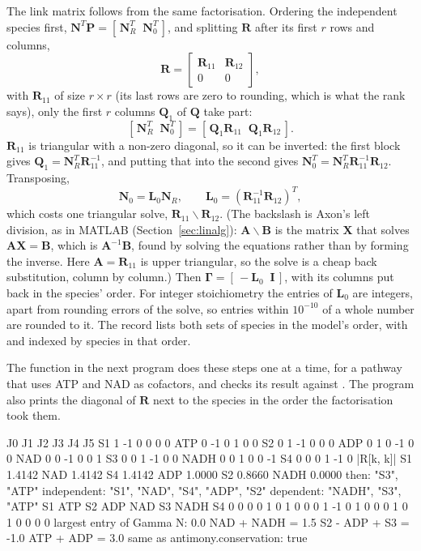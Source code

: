 \documentclass[11pt,a4paper,openany]{report}
\begin{document}
{{The link matrix follows from the same factorisation. Ordering the
independent species first, $\mathbf{N}^T \mathbf{P} = [\,\mathbf{N}_R^T
\;\; \mathbf{N}_0^T\,]$, and splitting $\mathbf{R}$ after its first $r$ rows
and columns,
\[
  \mathbf{R} = \begin{bmatrix} \mathbf{R}_{11} & \mathbf{R}_{12} \\ 0 & 0 \end{bmatrix} ,
\]
with $\mathbf{R}_{11}$ of size $r \times r$ (its last rows are zero to
rounding, which is what the rank says), only the first $r$ columns
$\mathbf{Q}_1$ of $\mathbf{Q}$ take part:
\[
  [\,\mathbf{N}_R^T \;\; \mathbf{N}_0^T\,]
    = [\,\mathbf{Q}_1 \mathbf{R}_{11} \;\; \mathbf{Q}_1 \mathbf{R}_{12}\,] .
\]
$\mathbf{R}_{11}$ is triangular with a non-zero diagonal, so it can be
inverted: the first block gives $\mathbf{Q}_1 = \mathbf{N}_R^T
\mathbf{R}_{11}^{-1}$, and putting that into the second gives
$\mathbf{N}_0^T = \mathbf{N}_R^T \mathbf{R}_{11}^{-1} \mathbf{R}_{12}$.
Transposing,
\[
  \mathbf{N}_0 = \mathbf{L}_0 \mathbf{N}_R ,
  \qquad
  \mathbf{L}_0 = (\mathbf{R}_{11}^{-1} \mathbf{R}_{12})^T ,
\]
which costs one triangular solve, $\mathbf{R}_{11} \backslash
\mathbf{R}_{12}$. (The backslash is Axon's left division, as in MATLAB
(Section~\ref{sec:linalg}):
$\mathbf{A} \backslash \mathbf{B}$ is the matrix $\mathbf{X}$ that solves
$\mathbf{A} \mathbf{X} = \mathbf{B}$, which is $\mathbf{A}^{-1} \mathbf{B}$,
found by solving the equations rather than by forming the inverse. Here
$\mathbf{A} = \mathbf{R}_{11}$ is upper triangular, so the solve is a cheap
back substitution, column by column.) Then $\mathbf{\Gamma} = [\,-\mathbf{L}_0 \;\;
\mathbf{I}\,]$, with its columns put back in the species' order. For
integer stoichiometry the entries of $\mathbf{L}_0$ are integers, apart from
rounding errors of the solve, so entries within $10^{-10}$ of a whole number
are rounded to it. The record lists both sets of species in the model's
order, with  and  indexed by species in that order.

The function  in the next program does these
steps one at a time, for a pathway that uses ATP and NAD as cofactors, and
checks its result against . The program also
prints the diagonal of $\mathbf{R}$ next to the species in the order the
factorisation took them.

\begin{axonout}
      J0  J1  J2  J3  J4  J5
S1     1  -1   0   0   0   0
ATP    0  -1   0   1   0   0
S2     0   1  -1   0   0   0
ADP    0   1   0  -1   0   0
NAD    0   0  -1   0   0   1
S3     0   0   1  -1   0   0
NADH   0   0   1   0   0  -1
S4     0   0   0   1  -1   0
      |R[k, k]|
S1       1.4142
NAD      1.4142
S4       1.4142
ADP      1.0000
S2       0.8660
NADH     0.0000
then: {"S3", "ATP"}
independent: {"S1", "NAD", "S4", "ADP", "S2"}
dependent: {"NADH", "S3", "ATP"}
S1  ATP  S2  ADP  NAD  S3  NADH  S4
 0    0   0    0    1   0     1   0
 0    0   1   -1    0   1     0   0
 0    1   0    1    0   0     0   0
largest entry of Gamma N: 0.0
NAD + NADH = 1.5
S2 - ADP + S3 = -1.0
ATP + ADP = 3.0
same as antimony.conservation: true
\end{axonout}

}}
\end{document}
